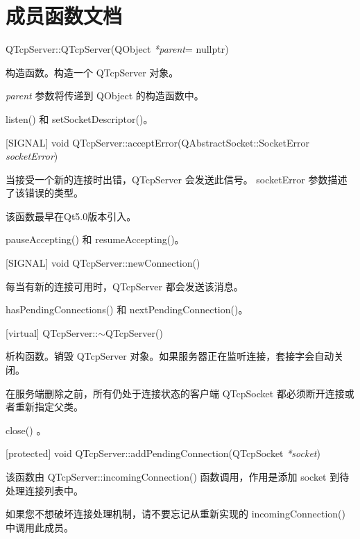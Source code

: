 \section{成员函数文档}

QTcpServer::QTcpServer(QObject  \emph{*parent}= nullptr)

构造函数。构造一个 QTcpServer 对象。

\emph{parent} 参数将传递到 QObject 的构造函数中。

\begin{notice}[另请参阅]
listen() 和 setSocketDescriptor()。
\end{notice}



[SIGNAL] void QTcpServer::acceptError(QAbstractSocket::SocketError \emph{socketError})

当接受一个新的连接时出错，QTcpServer 会发送此信号。 socketError 参数描述了该错误的类型。

该函数最早在Qt5.0版本引入。

\begin{notice}[另请参阅]
pauseAccepting() 和 resumeAccepting()。
\end{notice}

[SIGNAL] void QTcpServer::newConnection()

每当有新的连接可用时，QTcpServer 都会发送该消息。

\begin{notice}[另请参阅]
hasPendingConnections() 和 nextPendingConnection()。
\end{notice}

[virtual] QTcpServer::$\sim$QTcpServer()

析构函数。销毁 QTcpServer 对象。如果服务器正在监听连接，套接字会自动关闭。

在服务端删除之前，所有仍处于连接状态的客户端 QTcpSocket 都必须断开连接或者重新指定父类。

\begin{notice}[另请参阅]
 close() 。
\end{notice}


[protected] void QTcpServer::addPendingConnection(QTcpSocket  \emph{*socket})

该函数由 QTcpServer::incomingConnection() 函数调用，作用是添加 socket 到待处理连接列表中。

\begin{notice}
如果您不想破坏连接处理机制，请不要忘记从重新实现的 incomingConnection() 中调用此成员。
\end{notice}


